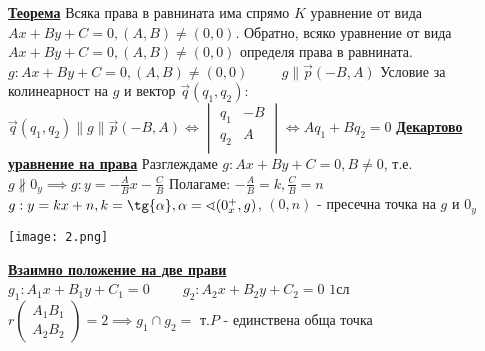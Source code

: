 \documentclass{article}
\begin{document}
\textbf{\underline{Теорема}} \newline
Всяка права в равнината има спрямо $K$ уравнение от вида $Ax + By + C = 0, (A, B) \neq (0, 0)$.
Обратно, всяко уравнение от вида $Ax + By + C = 0, (A, B) \neq (0, 0)$ определя права в равнината. \newline\newline
$g: Ax + By + C = 0, (A, B) \neq (0, 0) \hspace{1cm} g \parallel \vec{p}(-B, A)$ \newline\newline
Условие за колинеарност на $g$ и вектор $\vec{q}(q_1, q_2)$: \newline\newline
$\vec{q}(q_1, q_2) \parallel g \parallel \vec{p}(-B, A) \iff \begin{vmatrix}
    q_1 & -B \\ 
    q_2 & A \\
\end{vmatrix} \iff Aq_1 + Bq_2 = 0$ \newline\newline\newline\newline
\textbf{\underline{Декартово уравнение на права}} \newline\newline
Разглеждаме $g: Ax + By + C = 0, B \neq 0$, т.е. $g \nparallel 0_y \implies g: y = -\frac{A}{B}x - \frac{C}{B}$
Полагаме: $-\frac{A}{B} = k, \frac{C}{B} = n$ \newline
$g: y = kx + n, k = \tg{\alpha}, \alpha = \sphericalangle(0_x^+, g)$, $(0, n)$ - пресечна точка на $g$ и $0_y$ \newline\newline
\begin{center}
    \texttt{[image: 2.png]}
\end{center}
\textbf{\underline{Взаимно положение на две прави}} \newline\newline
$g_1: A_1x + B_1y + C_1 = 0 \hspace{1cm} g_2: A_2x + B_2y + C_2 = 0$ \newline\newline
$1$сл $r \begin{pmatrix} A_1 B_1 \\ A_2 B_2 \end{pmatrix} = 2 \implies g_1 \cap g_2 = \text{ т.} P$ - единствена обща точка \newline\newline
\end{document}
